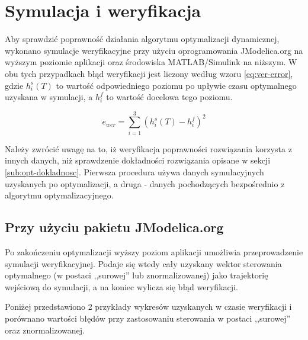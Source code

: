 \section{Symulacja i weryfikacja}
\label{sec:sym-wer}

Aby sprawdzić poprawność działania algorytmu optymalizacji dynamicznej, wykonano symulacje weryfikacyjne przy użyciu oprogramowania JModelica.org na wyższym poziomie aplikacji oraz środowiska MATLAB/Simulink na niższym.
W obu tych przypadkach błąd weryfikacji jest liczony według wzoru \ref{eq:ver-error}, gdzie $h_{i}^{s}(T)$ to wartość odpowiedniego poziomu po upływie czasu optymalnego uzyskana w symulacji, a $h_{i}^{f}$ to wartość docelowa tego poziomu.

\begin{equation}\label{eq:ver-error}
e_{wer} = \sum_{i=1}^{3} (h_{i}^{s}(T) - h_{i}^{f})^{2}
\end{equation}

Należy zwrócić uwagę na to, iż weryfikacja poprawności rozwiązania korzysta z innych danych, niż sprawdzenie dokładności rozwiązania opisane w sekcji \ref{sub:opt-dokladnosc}. Pierwsza procedura używa danych symulacyjnych uzyskanych po optymalizacji, a druga - danych pochodzących bezpośrednio z algorytmu optymalizacyjnego.

\subsection{Przy użyciu pakietu JModelica.org}
\label{sub:sym-wer-jmodelica}

Po zakończeniu optymalizacji wyższy poziom aplikacji umożliwia przeprowadzenie symulacji weryfikacyjnej. Podaje się wtedy cały uzyskany wektor sterowania optymalnego (w postaci ,,surowej'' lub znormalizowanej) jako trajektorię wejściową do symulacji, a na koniec wylicza się błąd weryfikacji.

Poniżej przedstawiono 2 przykłady wykresów uzyskanych w czasie weryfikacji i porównano wartości błędów przy zastosowaniu sterowania w postaci ,,surowej'' oraz znormalizowanej.

